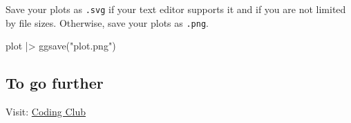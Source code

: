 \documentclass[
  letterpaper,
  DIV=11,
  numbers=noendperiod,
  oneside]{scrartcl}
\newenvironment{Shaded}{\begin{snugshade}}{\end{snugshade}}
\newcommand{\FunctionTok}[1]{\textcolor[rgb]{0.28,0.35,0.67}{#1}}
\newcommand{\NormalTok}[1]{\textcolor[rgb]{0.00,0.23,0.31}{#1}}
\newcommand{\SpecialCharTok}[1]{\textcolor[rgb]{0.37,0.37,0.37}{#1}}
\newcommand{\StringTok}[1]{\textcolor[rgb]{0.13,0.47,0.30}{#1}}
\begin{document}
Save your plots as \texttt{.svg} if your text editor supports it and if
you are not limited by file sizes. Otherwise, save your plots as
\texttt{.png}.

\begin{Shaded}
\begin{Highlighting}[]
\NormalTok{plot }\SpecialCharTok{|\textgreater{}} \FunctionTok{ggsave}\NormalTok{(}\StringTok{"plot.png"}\NormalTok{)}
\end{Highlighting}
\end{Shaded}

\subsection{To go further}\label{to-go-further}

Visit: \href{https://ourcodingclub.github.io/}{Coding Club}
\end{document}

